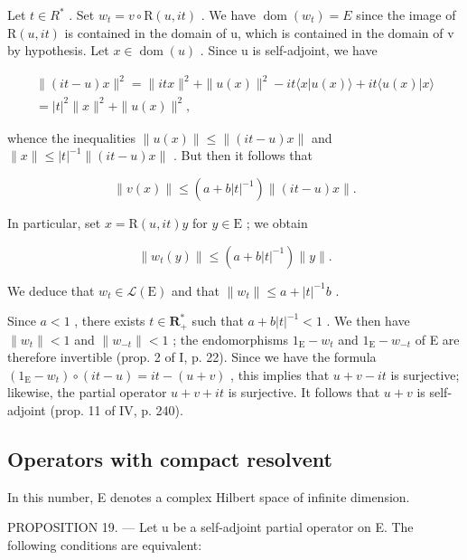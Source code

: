 Let \(t \in R^{*}\) . Set \(w_{t} = v \circ \mathrm{R}(u, it)\) . We have \(\operatorname{dom}(w_{t}) = E\) since the image of \(\mathrm{R}(u, it)\) is contained in the domain of u, which is contained in the domain of v by hypothesis. Let \(x \in \operatorname{dom}(u)\) . Since u is self-adjoint, we have

\[
\begin{array}{c} \| (i t - u) x \| ^ {2} = \| i t x \| ^ {2} + \| u (x) \| ^ {2} - i t \langle x | u (x) \rangle + i t \langle u (x) | x \rangle \\ = | t | ^ {2} \| x \| ^ {2} + \| u (x) \| ^ {2}, \end{array}
\]

whence the inequalities \(\|u(x)\|\leqslant\|(it-u)x\|\) and \(\|x\|\leqslant|t|^{-1}\|(it-u)x\|\) . But then it follows that

\[
\| v (x) \| \leqslant (a + b | t | ^ {- 1}) \| (i t - u) x \|.
\]

In particular, set \(x = \mathrm{R}(u, it)y\) for \(y \in \mathrm{E}\) ; we obtain

\[
\| w _ {t} (y) \| \leqslant (a + b | t | ^ {- 1}) \| y \|.
\]

We deduce that \(w_{t}\in\mathcal{L}(\mathrm{E})\) and that \(\|w_{t}\|\leqslant a+|t|^{-1}b\) .

Since \(a < 1\) , there exists \(t \in \mathbf{R}_{+}^{*}\) such that \(a + b|t|^{-1} < 1\) . We then have \(\|w_{t}\| < 1\) and \(\|w_{-t}\| < 1\) ; the endomorphisms \(1_{\mathrm{E}} - w_{t}\) and \(1_{\mathrm{E}} - w_{-t}\) of E are therefore invertible (prop. 2 of I, p. 22). Since we have the formula \((1_{\mathrm{E}} - w_{t}) \circ (it - u) = it - (u + v)\) , this implies that \(u + v - it\) is surjective; likewise, the partial operator \(u + v + it\) is surjective. It follows that \(u + v\) is self-adjoint (prop. 11 of IV, p. 240).

\subsection{Operators with compact resolvent}

In this number, E denotes a complex Hilbert space of infinite dimension.

PROPOSITION 19. --- Let u be a self-adjoint partial operator on E. The following conditions are equivalent:

